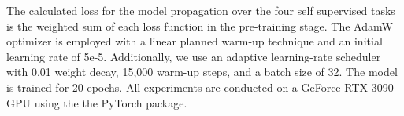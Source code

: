 \documentclass[letterpaper]{article} %
\newcommand{\kibitz}[2]{\ifnum\Comments=1{\textcolor{#1}{#2}}\fi}
\newcommand{\di}[1]{\kibitz{blue}{[DI:#1]}}
\begin{document}



The calculated loss for the model propagation over the four self supervised tasks is the weighted sum of each loss function in the pre-training stage.
The AdamW optimizer is employed with a linear planned warm-up technique and an initial learning rate of 5e-5.
Additionally, we use an adaptive learning-rate scheduler with 0.01 weight decay, 15,000 warm-up steps, and a batch size of 32. The model is trained for 20 epochs.
All experiments are conducted on a GeForce RTX 3090 GPU using the the PyTorch package.
\end{document}
